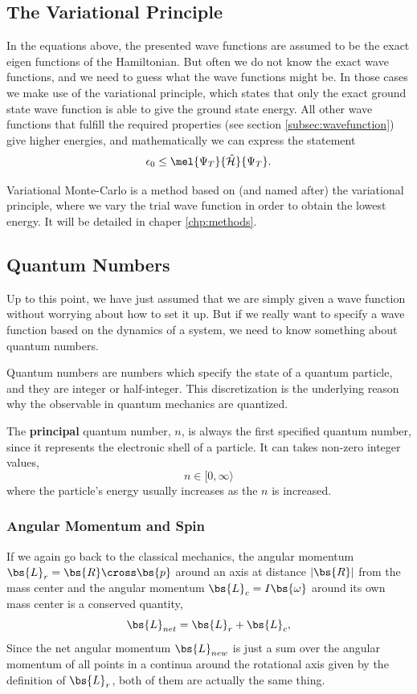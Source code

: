\cite{griffiths_introduction_2005}

\subsection{The Variational Principle}
In the equations above, the presented wave functions are assumed to be the exact eigen functions of the Hamiltonian. But often we do not know the exact wave functions, and we need to guess what the wave functions might be. In those cases we make use of the variational principle, which states that only the exact ground state wave function is able to give the ground state energy. All other wave functions that fulfill the required properties (see section \ref{subsec:wavefunction}) give higher energies, and mathematically we can express the statement
\begin{equation}
\epsilon_0\leq\mel{\Psi_T}{\hat{\mathcal{H}}}{\Psi_T}.
\label{eq:variationalprinciple}
\end{equation}

Variational Monte-Carlo is a method based on (and named after) the variational principle, where we vary the trial wave function in order to obtain the lowest energy. It will be detailed in chaper \eqref{chp:methods}.

\subsection{Quantum Numbers}
Up to this point, we have just assumed that we are simply given a wave function without worrying about how to set it up. But if we really want to specify a wave function based on the dynamics of a system, we need to know something about quantum numbers.

Quantum numbers are numbers which specify the state of a quantum particle, and they are integer or half-integer. This discretization is the underlying reason why the observable in quantum mechanics are quantized. 

The \textbf{principal} quantum number, $n$, is always the first specified quantum number, since it represents the electronic shell of a particle. It can takes non-zero integer values, 
\begin{equation}
n\in[0,\infty\rangle
\end{equation}
where the particle's energy usually increases as the $n$ is increased. 

\subsubsection{Angular Momentum and Spin}
If we again go back to the classical mechanics, the angular momentum $\bs{L}_r=\bs{R}\cross\bs{p}$ around an axis at distance $|\bs{R}|$ from the mass center and the angular momentum $\bs{L}_c=I\bs{\omega}$ around its own mass center is a conserved quantity,
\begin{equation}
\bs{L}_{net} = \bs{L}_r+\bs{L}_c,
\end{equation}
Since the net angular momentum $\bs{L}_{new}$ is just a sum over the angular momentum of all points in a continua around the rotational axis given by the definition of $\bs{L}_r$, both of them are actually the same thing.

